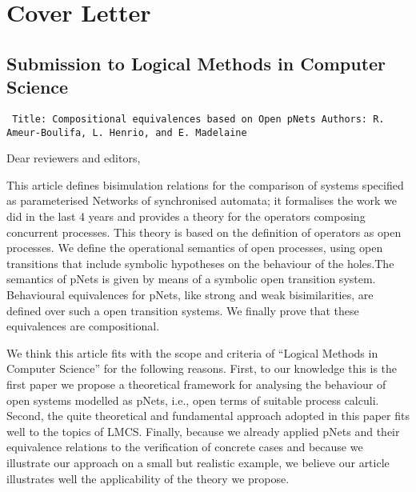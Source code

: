 \documentclass[10pt]{article}
\newenvironment{ttbox}{\begin{alltt}\small\tt}%
                      {\end{alltt}}
\begin{document}
\section*{Cover Letter }
\subsection*{Submission to Logical Methods in Computer Science}
\medskip
\begin{ttbox}
Title: Compositional equivalences based on Open pNets
Authors: R. Ameur-Boulifa, L. Henrio, and E. Madelaine
\end{ttbox}
\bigskip
Dear reviewers and editors,

\medskip
This article defines bisimulation relations  for the comparison of systems specified as parameterised Networks of synchronised automata; it formalises the work we did in the last 4 years and provides a theory for the operators composing concurrent processes. This theory is based on the definition of operators as open processes. We define the operational semantics of open processes, using open transitions that include symbolic hypotheses on the behaviour of the holes.The  semantics of pNets is given by means of a symbolic open transition system. Behavioural equivalences for pNets, like strong and weak bisimilarities, are defined over such a open transition systems. We finally prove that these equivalences are compositional.



\smallskip

We think this article fits with the scope and criteria of ``Logical Methods in Computer Science'' for the following reasons. First, to our knowledge this is the first paper we propose a theoretical framework for analysing the behaviour of open systems modelled as pNets, i.e., open terms of suitable process calculi.
Second, the quite theoretical and fundamental approach adopted in this paper fits well to the topics of LMCS.
Finally, because we already applied pNets and their equivalence relations to the verification of concrete cases and because we illustrate our approach on a small but realistic example, we believe our article illustrates well the applicability of the theory we propose.




\smallskip
\end{document}
